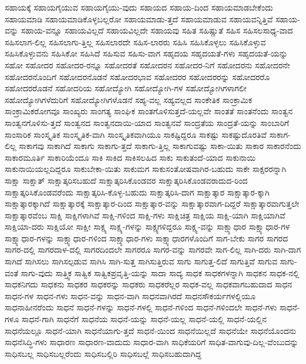 {ಸಹಾಯಕ್ಕೆ
ಸಹಾಯಗೈಯುವ
ಸಹಾಯಗೈಯು-ವುದು
ಸಹಾಯದ
ಸಹಾಯ-ದಿಂದ
ಸಹಾಯಮಾಡಬೇಕೆಂದು
ಸಹಾಯಮಾಡಿ
ಸಹಾಯಮಾಡಿಕೊಳ್ಳಬಲ್ಲರೋ
ಸಹಾಯಮಾಡು-ತ್ತದೆ
ಸಹಾಯಮಾಡುವ
ಸಹಾಯವನ್ನಿತ್ತಿವೆ
ಸಹಾಯ-ವನ್ನು
ಸಹಾಯ-ವನ್ನೂ
ಸಹಾಯವಿಲ್ಲದೆ
ಸಹಾಯವಿಲ್ಲದೇ
ಸಹಾಯವು
ಸಹಿತ
ಸಹಿಷ್ಣುತೆ
ಸಹಿಸ
ಸಹಿಸಲಸಾಧ್ಯ-ವಾದ
ಸಹಿಸಲಾಗ-ಲಿಲ್ಲ
ಸಹಿಸಲಾಗು-ತ್ತಿಲ್ಲ
ಸಹಿಸಲಾರದೇ
ಸಹಿಸ-ಲಾರರು
ಸಹಿಸಿ
ಸಹಿಸಿಕೊಳ್ಳಲು
ಸಹಿಸಿಕೊಳ್ಳುವ
ಸಹಿಸಿಕೊಳ್ಳುವನು
ಸಹಿಸಿಕೋ
ಸಹಿಸಿದೆ
ಸಹಿಸುವ
ಸಹಿಸು-ವಾಗ
ಸಹೃದಯ
ಸಹೃದಯತೆ-ಗಳು
ಸಹೃದಯತೆ-ಯನ್ನು
ಸಹೋ
ಸಹೋದರ
ಸಹೋದರ-ರನ್ನೂ
ಸಹೋದರತೆ
ಸಹೋದರನ
ಸಹೋದರ-ನಿಗೆ
ಸಹೋದರನು
ಸಹೋದರನೇ
ಸಹೋದರನೊಂದಿಗೆ
ಸಹೋದರನೊಡನೆ
ಸಹೋದರಭಾವ
ಸಹೋದರರ
ಸಹೋದರರನ್ನು
ಸಹೋದರರೊ
ಸಹೋದರರೊಡನೆ
ಸಹೋದರಿಯ
ಸಹೋದ್ಯೋಗಿ
ಸಹೋದ್ಯೋಗಿ-ಗಳ
ಸಹೋದ್ಯೋಗಿಗಳಾಗಲೀ
ಸಹೋದ್ಯೋಗಿಗಳೆದುರಿಗೆ
ಸಹೋದ್ಯೋಗಿಗಳೊಡನೆ
ಸಹ್ಯ-ವಲ್ಲ
ಸಹ್ಯವಲ್ಲದ
ಸಾಂಕೇತಿಕ
ಸಾಂಕ್ರಾಮಿಕ
ಸಾಂಕ್ರಾಮಿಕರೋಗವೂ
ಸಾಂಖ್ಯರು
ಸಾಂಗತ್ಯ
ಸಾಂಘಿಕ
ಸಾಂತಗೊಳಿಸುತ್ತದೆ-ಯಲ್ಲವೇ
ಸಾಂತತೆ
ಸಾಂತನೆಂದು
ಸಾಂತ್ವನ
ಸಾಂತ್ವನಗೊಳಿಸು-ತ್ತದೆ
ಸಾಂತ್ವನದ
ಸಾಂತ್ವನದಾಯಿ-ಯಾದ
ಸಾಂತ್ವನವೆ
ಸಾಂದ್ರತೆಯ
ಸಾಂದ್ರತೆ-ಯನ್ನು
ಸಾಂಬಾರಿಗೆ
ಸಾಂಸಾರಿಕ
ಸಾಂಸ್ಕೃತಿಕ
ಸಾಂಸ್ಕೃತಿಕ-ವಾಗಿ
ಸಾಂಸ್ಕೃತಿಕವಾಗಿಯೂ
ಸಾಕಷ್ಟಿದ್ದರೂ
ಸಾಕಷ್ಟು
ಸಾಕಷ್ಟುದೊರತಿವೆ
ಸಾಕಾಗ-ಲಿಲ್ಲ
ಸಾಕಾಗವು
ಸಾಕಾಗಿದೆ
ಸಾಕಾಗು
ಸಾಕಾಗು-ತ್ತದೆ
ಸಾಕಾಗು-ತ್ತಿಲ್ಲ
ಸಾಕಾಗುವಷ್ಟು
ಸಾಕಾ-ಯಿತು
ಸಾಕಾರ
ಸಾಕಾರನೆಂದು
ಸಾಕಾರಮೂರ್ತಿ
ಸಾಕಾರಿಯೆಂದೂ
ಸಾಕಿ
ಸಾಕಿದ
ಸಾಕಿಸಲಹಿದ
ಸಾಕು
ಸಾಕುತಂದೆ-ಯಾದ
ಸಾಕುನಾಯಿ
ಸಾಕುನಾಯಿಯಲ್ಲದಿದ್ದರೂ
ಸಾಕುಬೇಕಾ-ಯಿತು
ಸಾಕುಮಗ
ಸಾಕುಸಂತೋಷವಾಗಿರ-ಬಹುದು
ಸಾಕೇ
ಸಾಕ್ಷರರನ್ನಾಗಿ
ಸಾಕ್ಷಾ
ಸಾಕ್ಷಾತ್
ಸಾಕ್ಷಾತ್ಕರಿಸಬಹುದೆ
ಸಾಕ್ಷಾತ್ಕರಿಸಿಕೊಂಡವರ
ಸಾಕ್ಷಾತ್ಕರಿಸಿಕೊಂಡವರಾದುದ-ರಿಂದ
ಸಾಕ್ಷಾತ್ಕರಿಸಿಕೊಂಡವರೆಂದು
ಸಾಕ್ಷಾತ್ಕರಿಸಿ-ಕೊಳ್ಳ-ಬಹುದು
ಸಾಕ್ಷಾತ್ಕರಿಸಿ-ದಾಗ
ಸಾಕ್ಷಾತ್ಕಾರ
ಸಾಕ್ಷಾತ್ಕಾರ-ಕ್ಕಾಗಿ
ಸಾಕ್ಷಾತ್ಕಾರಕ್ಕಾಗಿದೆ
ಸಾಕ್ಷಾತ್ಕಾರಕ್ಕೆ
ಸಾಕ್ಷಾತ್ಕಾರ-ದಿಂದ
ಸಾಕ್ಷಾತ್ಕಾರ-ವನ್ನು
ಸಾಕ್ಷಾತ್ಕಾರವಾಗ-ದಿದ್ದರೆ
ಸಾಕ್ಷಾತ್ಕಾರವಾಗುತ್ತಲೇ
ಸಾಕ್ಷಾತ್ಕಾರವೆಂಬ
ಸಾಕ್ಷಿ
ಸಾಕ್ಷಿಗಳಾಗಿವೆ
ಸಾಕ್ಷಿ-ಗಳಿಂದ
ಸಾಕ್ಷಿ-ಗಳು
ಸಾಕ್ಷಿಚಿತ್ರ
ಸಾಕ್ಷಿಯ
ಸಾಕ್ಷಿ-ಯಾಗಿ
ಸಾಕ್ಷಿಯಾಗಿವೆ
ಸಾಕ್ಷಿಯಾ-ದರು
ಸಾಕ್ಷಿಯೋ
ಸಾಕ್ಷೀ
ಸಾಕ್ಷ್ಯ
ಸಾಕ್ಷ್ಯ-ಗಳನ್ನು
ಸಾಕ್ಷ್ಯಗಳಿದ್ದರೂ
ಸಾಕ್ಷ್ಯ-ವನ್ನು
ಸಾಕ್ಷ್ಯಾಧಾರ
ಸಾಕ್ಷ್ಯಾಧಾರ-ಗಳ
ಸಾಕ್ಷ್ಯಾಧಾರ-ಗಳನ್ನು
ಸಾಕ್ಷ್ಯಾಧಾರ-ಗಳಿಂದ
ಸಾಕ್ಷ್ಯಾಧಾರ-ಗಳು
ಸಾಕ್ಷ್ಯಾಧಾರಗಳೊಂದಿಗೆ
ಸಾಗ-ಬೇಕು
ಸಾಗರ
ಸಾಗರದ
ಸಾಗರ-ದಲ್ಲಿ
ಸಾಗರದಾಳ-ದಲ್ಲಿ
ಸಾಗರದಿಂದಲೇ
ಸಾಗರರೂ
ಸಾಗರ-ವನ್ನು
ಸಾಗರವೇ
ಸಾಗ-ಲಿಲ್ಲ
ಸಾಗಿ-ದರು
ಸಾಗಿ-ದಾಗ
ಸಾಗಿದೆ
ಸಾಗಿಸಲು
ಸಾಗಿಸಲ್ಪಡುವ
ಸಾಗಿಸಿ
ಸಾಗಿ-ಸುತ್ತ
ಸಾಗಿಸುತ್ತಿರುವ
ಸಾಗು
ಸಾಗುತ್ತ-ಲಿದೆ
ಸಾಗುತ್ತಿವೆ
ಸಾಗುವ
ಸಾಗು-ವಂತೆ
ಸಾಗು-ವುದು
ಸಾತ್ತ್ವಿಕ
ಸಾತ್ವಿಕ
ಸಾತ್ವಿಕಪ್ರವೃತ್ತಿ-ಯನ್ನು
ಸಾದಾ
ಸಾದ್ಯ
ಸಾಧಕ
ಸಾಧಕಗಳನ್ನಾಗಿ
ಸಾಧಕನ
ಸಾಧಕ-ನಲ್ಲಿ
ಸಾಧಕನಿಗದು
ಸಾಧಕನು
ಸಾಧಕರ
ಸಾಧಕರನ್ನು
ಸಾಧಕರು
ಸಾಧಕರೆಲ್ಲರ
ಸಾಧಕ-ವಲ್ಲ
ಸಾಧಕವಾಗಬಹುದಾದ
ಸಾಧನ
ಸಾಧನ-ಗಳ
ಸಾಧನ-ಗಳು
ಸಾಧನ-ವನ್ನು
ಸಾಧನ-ವಾಗಿ
ಸಾಧನವಾಗಿರದೆ
ಸಾಧನಸೌಕರ್ಯಗಳಲ್ಲಿಯೂ
ಸಾಧನಾಹೀನರೆಂದು
ಸಾಧನೆ
ಸಾಧನೆ-ಗಳನ್ನು
ಸಾಧನೆ-ಗಳಲ್ಲಿ
ಸಾಧನೆ-ಗಳಿಂದ
ಸಾಧನೆ-ಗಳಿಂದಲೇ
ಸಾಧನೆ-ಗಳು
ಸಾಧನೆ-ಗಳೂ
ಸಾಧನೆ-ಗಾಗಿ
ಸಾಧನೆಗೆ
ಸಾಧನೆಯ
ಸಾಧನೆ-ಯನ್ನು
ಸಾಧನೆ-ಯಲ್ಲ
ಸಾಧನೆ-ಯಲ್ಲಿ
ಸಾಧನೆ-ಯಲ್ಲಿನ
ಸಾಧನೆಯಲ್ಲೂ
ಸಾಧನೆ-ಯಾಗಿ
ಸಾಧನೆಯಾಗು-ತ್ತದೆ
ಸಾಧನೆ-ಯಿಂದ
ಸಾಧನೆಯಿಲ್ಲದೆ
ಸಾಧನೆಯೇ
ಸಾಧನೆಯೊಂದನು
ಸಾಧನೆಸಿದ್ಧಿ-ಗಳು
ಸಾಧಾರಣ
ಸಾಧಾರಣ-ವಾದುದು
ಸಾಧಾರ-ವಾಗಿ
ಸಾಧಿಕೆಯರಿಗೆ
ಸಾಧಿತ-ವಾಗುವು-ದಿಲ್ಲ-ವೆಂಬುದನ್ನು
ಸಾಧಿಸಬಲ್ಲ
ಸಾಧಿಸಬಲ್ಲರೆಂದು
ಸಾಧಿಸಬಲ್ಲಿರಿ
ಸಾಧಿಸಬಲ್ಲೆ
ಸಾಧಿಸಬಹುದಾಗಿದ್ದ
}
